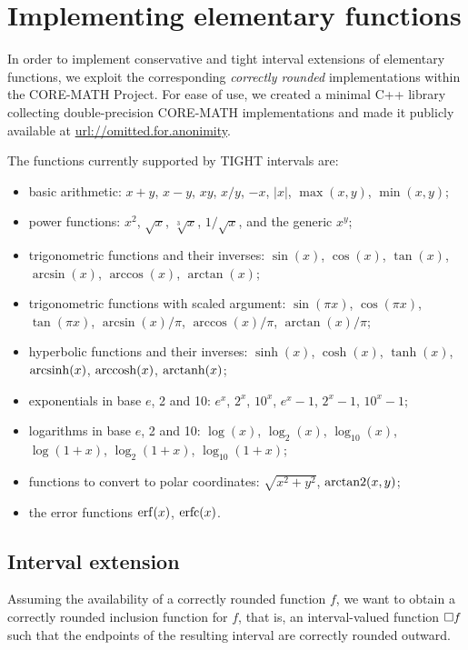 
\section{Implementing elementary functions}
\label{sec:functions}
In order to implement conservative and tight interval extensions of elementary functions, we exploit the corresponding \emph{correctly rounded} implementations within the CORE-MATH Project.
For ease of use, we created a minimal C++ library collecting double-precision CORE-MATH implementations and made it publicly available at \url{url://omitted.for.anonimity}.

The functions currently supported by TIGHT intervals are:
\begin{itemize}
	\item basic arithmetic: $x+y$, $x-y$, $xy$, $x/y$, $-x$, $|x|$, $\max(x,y)$, $\min(x,y)$;
	\item power functions: $x^2$, $\sqrt{x}$, $\sqrt[3]{x}$, $1/\sqrt{x}$, and the generic $x^y$;
	\item trigonometric functions and their inverses: $\sin(x)$, $\cos(x)$, $\tan(x)$, $\arcsin(x)$, $\arccos(x)$, $\arctan(x)$;
	\item trigonometric functions with scaled argument: $\sin(\pi x)$, $\cos(\pi x)$, $\tan(\pi x)$, $\arcsin(x)/\pi$, $\arccos(x)/\pi$, $\arctan(x)/\pi$;
	\item hyperbolic functions and their inverses: $\sinh(x)$, $\cosh(x)$, $\tanh(x)$, $\operatorname{arcsinh}(x)$, $\operatorname{arccosh}(x)$, $\operatorname{arctanh}(x)$;
	\item exponentials in base $e$, 2 and 10: $e^x$, $2^x$, $10^x$, $e^x-1$, $2^x-1$, $10^x-1$;
	\item logarithms in base $e$, 2 and 10: $\log(x)$, $\log_2(x)$, $\log_{10}(x)$, $\log(1+x)$, $\log_2(1+x)$, $\log_{10}(1+x)$;
	\item functions to convert to polar coordinates: $\sqrt{x^2+y^2}$, $\operatorname{arctan2}(x,y)$;
	\item the error functions $\operatorname{erf}(x)$, $\operatorname{erfc}(x)$.
\end{itemize}

\subsection{Interval extension}
Assuming the availability of a correctly rounded function $f$, we want to obtain a correctly rounded inclusion function for $f$, that is, an interval-valued function $\Box f$ such that the endpoints of the resulting interval are correctly rounded outward.

